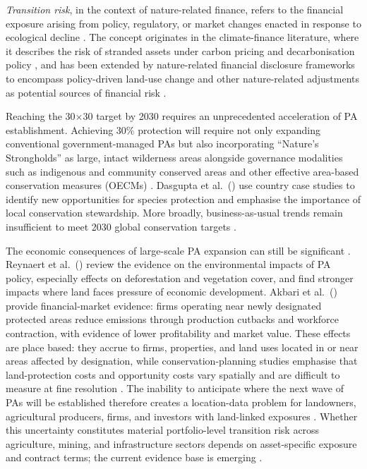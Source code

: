 \documentclass[12pt]{article}
\theoremstyle{break}
\begin{document}
\emph{Transition risk}, in the context of nature-related finance, refers to the financial
exposure arising from policy, regulatory, or market changes enacted in response to
ecological decline \citep{tnfd2023}. The concept originates in the climate-finance
literature, where it describes the risk of stranded assets under carbon pricing and
decarbonisation policy \citep{daumas2024, semieniuk2022, caldecott2021, vanderploeg2020}, and has been extended by nature-related
financial disclosure frameworks to encompass policy-driven land-use change and other
nature-related adjustments as potential sources of financial risk
\citep{govind2025, tnfd2023}.

Reaching the 30$\times$30 target by 2030 requires an unprecedented acceleration of PA
establishment. Achieving 30\%
protection will require not only expanding conventional government-managed PAs but also
incorporating ``Nature's Strongholds'' as large, intact wilderness areas alongside 
governance modalities such as indigenous and community conserved areas and other
effective area-based conservation measures (OECMs) \citep{robinson2024,fitzsimons2025}. 
Dasgupta et al.\ (\citeyear{dasgupta2025}) use country case studies to identify new opportunities for
species protection and emphasise the importance of local conservation stewardship.
More broadly, business-as-usual trends remain insufficient to meet 2030 global
conservation targets \citep{palomo2025}.

The economic consequences of large-scale PA expansion can still be significant
\citep{jago2024}.
Reynaert et al.\ (\citeyear{reynaert2024}) review the evidence on the environmental
impacts of PA policy, especially effects on deforestation and vegetation cover, and
find stronger impacts where land faces pressure of economic development.
Akbari et al.\ (\citeyear{akbari2025}) provide financial-market evidence:
firms operating near newly designated protected areas reduce emissions through
production cutbacks and workforce contraction, with evidence of lower
profitability and market value. These effects are place based: they accrue to
firms, properties, and land uses located in or near areas affected by designation,
while conservation-planning studies emphasise that land-protection costs and
opportunity costs vary spatially and are difficult to measure at fine resolution
\citep{akbari2025, sutton2016, christiaen2025}. The inability to anticipate where
the next wave of PAs will be established therefore creates a location-data problem
for landowners, agricultural producers, firms, and investors with land-linked
exposures \citep{frank2025, sutton2016, christiaen2025, fsb2024, tnfd2023}. Whether this uncertainty constitutes material portfolio-level
transition risk across agriculture, mining, and infrastructure sectors depends on
asset-specific exposure and contract terms; the current evidence base is emerging
\citep{govind2025, tnfd2023}.
\end{document}
